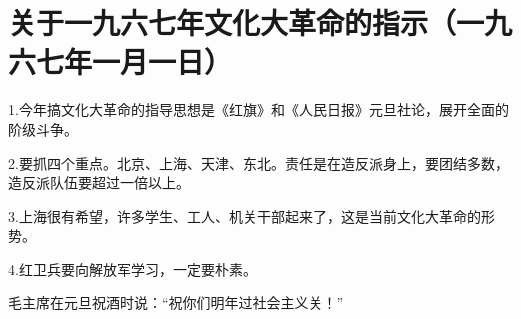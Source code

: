 \section[关于一九六七年文化大革命的指示（一九六七年一月一日）]{关于一九六七年文化大革命的指示（一九六七年一月一日）}


1.今年搞文化大革命的指导思想是《红旗》和《人民日报》元旦社论，展开全面的阶级斗争。

2.要抓四个重点。北京、上海、天津、东北。责任是在造反派身上，要团结多数，造反派队伍要超过一倍以上。

3.上海很有希望，许多学生、工人、机关干部起来了，这是当前文化大革命的形势。

4.红卫兵要向解放军学习，一定要朴素。

毛主席在元旦祝酒时说：“祝你们明年过社会主义关！”



